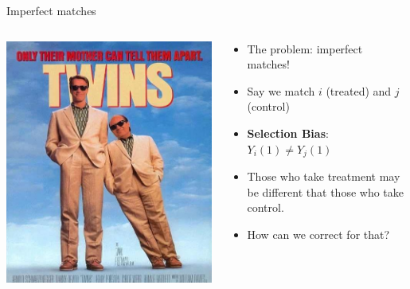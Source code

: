 \documentclass[
  ignorenonframetext,
]{beamer}
\begin{document}
\begin{frame}{Imperfect matches}
\label{imperfect-matches}
\begin{columns}
  \begin{column}{0.4\textwidth}
    \includegraphics[width=1\textwidth]{figs/twins.jpg}
  \end{column} \pause
  \begin{column}{0.6\textwidth}
  \begin{itemize}
  \item The problem: imperfect matches! \pause
  \item Say we match $i$ (treated) and $j$ (control) \pause
  \item \textbf{Selection Bias}: $Y_i (1) \neq Y_j (1)$  \pause
  \item Those who take treatment may be different that those who take control. \pause
  \item How can we correct for that?
  \end{itemize}
  \end{column}
\end{columns}
\end{frame}
\end{document}
